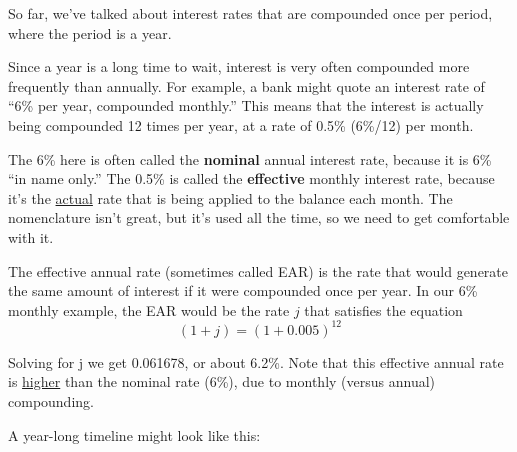\documentclass[14pt]{extarticle}
\begin{document}

\setlength{\parskip}{0.75em}

So far, we've  talked about interest rates that are compounded once per period, where the period is a year.

Since a year is a long time to wait, interest is very often compounded more frequently than annually.  For example,
a bank might quote an interest rate of ``6\% per year, compounded monthly.''  This means that the interest is
actually being compounded 12 times per year, at a rate of 0.5\% (6\%/12) per month.

The 6\% here is often called the \textbf{nominal} annual interest rate, because it is 6\% ``in name only.'' The
0.5\% is called the \textbf{effective} monthly interest rate, because it's the \underline{actual} rate that is being
applied to the balance each month. The nomenclature isn't great, but it's used all the time, so we need to get
comfortable with it.

The effective annual rate (sometimes called EAR) is the rate that would generate the same amount of interest if it were
compounded once per year.  In our 6\% monthly example, the EAR would be the rate $j$ that satisfies the equation
\[
  (1 + j) = (1 + 0.005)^{12}
\]

Solving for j we get 0.061678, or about 6.2\%.  Note that this effective annual rate is \underline{higher} than the
nominal rate (6\%), due to monthly (versus annual) compounding.

A year-long timeline might look like this:

\begin{center}
\end{center}
\end{document}
